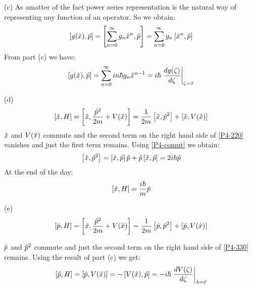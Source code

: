 \begin{homeworkProblem}
\begin{homeworkSection}{(c)}
As amatter of the fact power series representation is the natural way of  representing any function of an operator. So we obtain:
\begin{equation}
\left[g(\Hat{x}),\Hat{p}\right]=\left[\sum_{n=0}^{\infty}g_n\Hat{x}^n,\Hat{p}\right]=\sum_{n=0}^{\infty}g_n\left[\Hat{x}^n,\Hat{p}\right]
\end{equation} 
From part (c) we have:
\begin{equation}
\left[g(\Hat{x}),\Hat{p}\right]=\sum_{n=0}^{\infty}in\hbar g_n\Hat{x}^{n-1}=i\hbar\left.\frac{dg(\zeta)}{d\zeta}\right|_{\zeta=\Hat{x}}
\end{equation}
\end{homeworkSection}
\begin{homeworkSection}{(d)}
\begin{equation}\label{P4-220}
\left[\Hat{x},H\right]=\left[\Hat{x},\frac{\Hat{p}^2}{2m}+V(\Hat{x})\right]=\frac{1}{2m}\left[\Hat{x},\Hat{p}^2\right]+\left[\Hat{x},V(\Hat{x})\right]
\end{equation}
$\Hat{x}$ and $V(\Hat{x})$ commute and the second term on the right hand side of \eqref{P4-220} vanishes and just the first term remains. Using \eqref{P4-comut} we obtain:
\begin{equation}
\left[\Hat{x},\Hat{p}^2\right]=\left[\Hat{x},\Hat{p}\right]\Hat{p}+\Hat{p}\left[\Hat{x},\Hat{p}\right]=2i\hbar\Hat{p}
\end{equation}
At the end of the day:
\begin{equation}
\left[\Hat{x},H\right]=\frac{i\hbar}{m}\Hat{p}
\end{equation}

\end{homeworkSection}

\begin{homeworkSection}{(e)}
\begin{equation}\label{P4-330}
\left[\Hat{p},H\right]=\left[\Hat{x},\frac{\Hat{p}^2}{2m}+V(\Hat{x})\right]=\frac{1}{2m}\left[\Hat{p},\Hat{p}^2\right]+\left[\Hat{p},V(\Hat{x})\right]
\end{equation}

$\Hat{p}$ and $\Hat{p}^2$ commute and just the second term on the right hand side of \eqref{P4-330} remains. Using the result of part (c) we get:
\begin{equation}
\left[\Hat{p},H\right]=\left[\Hat{p},V(\Hat{x})\right]=-\left[V(\Hat{x}),\Hat{p}\right]=-i\hbar\left.\frac{dV(\zeta)}{d\zeta}\right|_{\lambda=\Hat{x}}
\end{equation}
\end{homeworkSection}








\end{homeworkProblem}